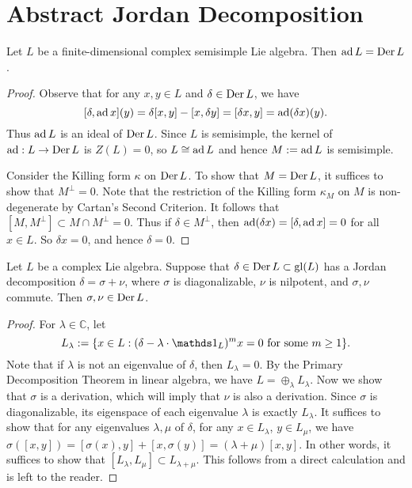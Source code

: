 \section{Abstract Jordan Decomposition}

\begin{lem}\label{ss_ad_eq_Der}
    Let $L$ be a finite-dimensional complex semisimple Lie algebra. Then $\operatorname{ad} L=\operatorname{Der} L$. 
\end{lem}

\begin{proof}
    Observe that for any $x,y\in L$ and $\delta\in \operatorname{Der} L$, we have 
    \[
        [\delta ,\operatorname{ad} x](y)=\delta[x,y]-[x,\delta y]=[\delta x,y]=\operatorname{ad} (\delta x)(y).
    \]
    Thus $\operatorname{ad} L$ is an ideal of $\operatorname{Der} L$. Since $L$ is semisimple, the kernel of $\operatorname{ad}:L\to \operatorname{Der} L$ is $Z(L)=0$, so $L\cong \operatorname{ad} L$ and hence $M:=\operatorname{ad} L$ is semisimple.

    Consider the Killing form $\kappa$ on $\operatorname{Der} L$. To show that $M=\operatorname{Der} L$, it suffices to show that $M^\perp=0$. Note that the restriction of the Killing form $\kappa_M$ on $M$ is non-degenerate by Cartan's Second Criterion. It follows that $[M,M^\perp]\subset M\cap M^\perp =0$. Thus if $\delta\in M^\perp$, then $\operatorname{ad} (\delta x)=[\delta ,\operatorname{ad} x]=0$ for all $x\in L$. So $\delta x=0$, and hence $\delta=0$.
\end{proof}

\begin{prop}\label{d_n_in_Der}
    Let $L$ be a complex Lie algebra. Suppose that $\delta\in \operatorname{Der} L\subset \mathrm{gl}(L)$ has a Jordan decomposition $\delta=\sigma+\nu$, where $\sigma$ is diagonalizable, $\nu$ is nilpotent, and $\sigma,\nu$ commute. Then $\sigma,\nu\in \operatorname{Der} L$.
\end{prop}

\begin{proof}
    For $\lambda\in\mathbb{C}$, let 
    \[
        L_\lambda:=\{x\in L: (\delta-\lambda \cdot \id_L)^m x=0\mbox{ for some }m\geq 1\}.
    \]
    Note that if $\lambda$ is not an eigenvalue of $\delta$, then $L_\lambda=0$. By the Primary Decomposition Theorem in linear algebra, we have $L=\oplus_\lambda L_\lambda$. Now we show that $\sigma$ is a derivation, which will imply that $\nu$ is also a derivation. Since $\sigma$ is diagonalizable, its eigenspace of each eigenvalue $\lambda$ is exactly $L_\lambda$. It suffices to show that for any eigenvalues $\lambda,\mu$ of $\delta$, for any $x\in L_\lambda$, $y\in L_\mu$, we have $\sigma([x, y]) = [\sigma(x), y]+[x, \sigma(y)]=(\lambda+\mu)[x,y]$. In other words, it suffices to show that $[L_\lambda,L_\mu]\subset L_{\lambda+\mu}$. This follows from a direct calculation and is left to the reader.
\end{proof}

